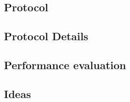 \subsection{Protocol}

\subsection{Protocol Details}


\subsection{Performance evaluation}



\subsection{Ideas}



% 
% 

